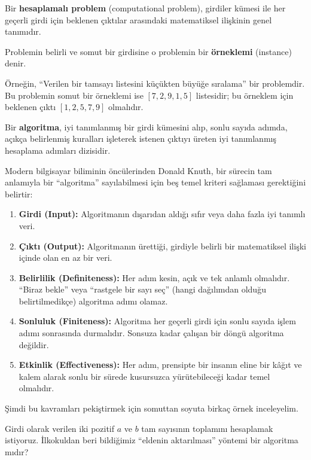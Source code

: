 \begin{definition}
Bir \textbf{hesaplamalı problem} (computational problem), girdiler kümesi ile her geçerli girdi için beklenen çıktılar arasındaki matematiksel ilişkinin genel tanımıdır. 

Problemin belirli ve somut bir girdisine o problemin bir \textbf{örneklemi} (instance) denir. 
\end{definition}

Örneğin, ``Verilen bir tamsayı listesini küçükten büyüğe sıralama'' bir problemdir. Bu problemin somut bir örneklemi ise $[7, 2, 9, 1, 5]$ listesidir; bu örneklem için beklenen çıktı $[1, 2, 5, 7, 9]$ olmalıdır.

\begin{definition}[Algoritma]
Bir \textbf{algoritma}, iyi tanımlanmış bir girdi kümesini alıp, sonlu sayıda adımda, açıkça belirlenmiş kuralları işleterek istenen çıktıyı üreten iyi tanımlanmış hesaplama adımları dizisidir.
\end{definition}

Modern bilgisayar biliminin öncülerinden Donald Knuth, bir sürecin tam anlamıyla bir ``algoritma'' sayılabilmesi için beş temel kriteri sağlaması gerektiğini belirtir:
\begin{enumerate}
    \item \textbf{Girdi (Input):} Algoritmanın dışarıdan aldığı sıfır veya daha fazla iyi tanımlı veri.
    \item \textbf{Çıktı (Output):} Algoritmanın ürettiği, girdiyle belirli bir matematiksel ilişki içinde olan en az bir veri.
    \item \textbf{Belirlilik (Definiteness):} Her adım kesin, açık ve tek anlamlı olmalıdır. ``Biraz bekle'' veya ``rastgele bir sayı seç'' (hangi dağılımdan olduğu belirtilmedikçe) algoritma adımı olamaz.
    \item \textbf{Sonluluk (Finiteness):} Algoritma her geçerli girdi için sonlu sayıda işlem adımı sonrasında durmalıdır. Sonsuza kadar çalışan bir döngü algoritma değildir.
    \item \textbf{Etkinlik (Effectiveness):} Her adım, prensipte bir insanın eline bir kâğıt ve kalem alarak sonlu bir sürede kusursuzca yürütebileceği kadar temel olmalıdır.
\end{enumerate}

Şimdi bu kavramları pekiştirmek için somuttan soyuta birkaç örnek inceleyelim.

\begin{example}
Girdi olarak verilen iki pozitif $a$ ve $b$ tam sayısının toplamını hesaplamak istiyoruz. İlkokuldan beri bildiğimiz ``eldenin aktarılması'' yöntemi bir algoritma mıdır?
\end{example}


